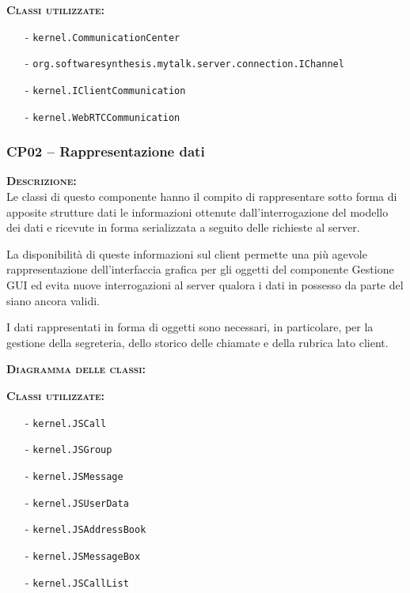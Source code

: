 \begin{description}
	\item{\scshape\bfseries Classi utilizzate:} 
	\begin{itemize}[noitemsep,nolistsep]
		\item[-] \texttt{kernel.CommunicationCenter}
		\item[-] \texttt{org.softwaresynthesis.mytalk.server.connection.IChannel}
		\item[-] \texttt{kernel.IClientCommunication}
		\item[-] \texttt{kernel.WebRTCCommunication}
	\end{itemize}  
\end{description}

\subsubsection{CP02 -- Rappresentazione dati}
\begin{description}
  \item{\scshape\bfseries Descrizione:}\\
Le classi di questo componente hanno il compito di rappresentare sotto forma di apposite strutture dati le informazioni ottenute dall'interrogazione del modello dei dati e ricevute in forma serializzata a seguito delle richieste al server.

La disponibilità di queste informazioni sul client permette una più agevole rappresentazione dell'interfaccia grafica per gli oggetti del componente \textsf{Gestione GUI} ed evita nuove interrogazioni al server qualora i dati in possesso da parte del  siano ancora validi.

I dati rappresentati in forma di oggetti sono necessari, in particolare, per la gestione della segreteria, dello storico delle chiamate e della rubrica lato client.

  \item{\scshape\bfseries Diagramma delle classi:}\\

	\item{\scshape\bfseries Classi utilizzate:} 
	\begin{itemize}[noitemsep,nolistsep]
		\item[-] \texttt{kernel.JSCall}
		\item[-] \texttt{kernel.JSGroup}
		\item[-] \texttt{kernel.JSMessage}
		\item[-] \texttt{kernel.JSUserData}
		\item[-] \texttt{kernel.JSAddressBook}
		\item[-] \texttt{kernel.JSMessageBox}
    \item[-] \texttt{kernel.JSCallList}
	\end{itemize}  
\end{description}

